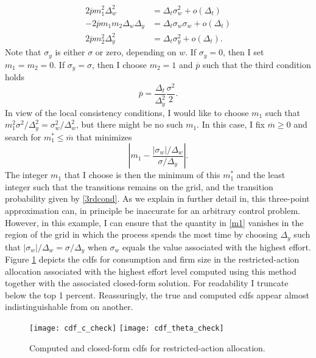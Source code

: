 \documentclass[11pt]{article}
\theoremstyle{plain}
\begin{document}
\begin{align*}
2 \overline{p} m_1^2 \Delta_w^2 & = \Delta_t \sigma_w^2 + o(\Delta_t)
\\ -2 \overline{p} m_1 m_2 \Delta_w \Delta_y & = \Delta_t \sigma_w \sigma_w + o(\Delta_t)
\\ 2 \overline{p} m_2^2 \Delta_y^2 & = \Delta_t \sigma_y^2 + o(\Delta_t).
\end{align*}
Note that $\sigma_y$ is either $\sigma$ or zero, depending on $w$. If $\sigma_y=0$, then I set $m_1=m_2=0$. If $\sigma_y = \sigma$, then I choose $m_2=1$ and $\overline{p}$ such that the third condition holds
\begin{equation} 
\overline{p} = \frac{\Delta_t}{\Delta_y^2} \frac{\sigma^2}{2}. 
\label{3rdcond} 
\end{equation} 
In view of the local consistency conditions, I would like to choose $m_1$ such that $m_1^2 \sigma^2/\Delta_y^2 = \sigma_w^2/\Delta_w^2$, but there might be no such $m_1$. In this case, I fix $\overline{m} \geq 0$ and search for $m_1^* \leq \overline{m}$ that minimizes
\begin{equation}
{\left| m_1  - \frac{|\sigma_w|/\Delta_w}{\sigma/\Delta_y} \right|}.
\label{m1}
\end{equation}
The integer $m_1$ that I choose is then the minimum of this $m^*_1$ and the least integer such that the transitions remains on the grid, and the transition probability given by \eqref{3rdcond}. As we explain in further detail in\cite{phelan_applications_2022}, this three-point approximation can, in principle be inaccurate for an arbitrary control problem. However, in this example, I can ensure that the quantity in \eqref{m1} vanishes in the region of the grid in which the process spends the most time by choosing $\Delta_y$ such that $|\sigma_w|/\Delta_w = \sigma/\Delta_y$ when $\sigma_w$ equals the value associated with the highest effort. Figure \ref{fig:cdf_check} depicts the cdfs for consumption and firm size in the restricted-action allocation associated with the highest effort level computed using this method together with the associated closed-form solution. For readability I truncate below the top 1 percent. Reassuringly, the true and computed cdfs appear almost indistinguishable from on another. 

\begin{figure}[!htb]
\centering
\texttt{[image: cdf\_c\_check]}
\texttt{[image: cdf\_theta\_check]}
\caption{Computed and closed-form cdfs for restricted-action allocation.}\label{fig:cdf_check}
\end{figure}
\end{document}
